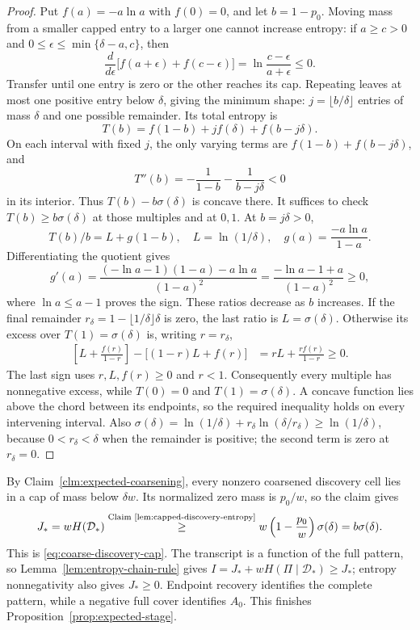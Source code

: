 \begin{proof}
Put $f(a)=-a\ln a$ with $f(0)=0$, and let $b=1-p_0$.
Moving mass from a smaller capped entry to a larger one cannot
increase entropy: if $a\ge c>0$ and
$0\le\epsilon\le\min\{\delta-a,c\}$, then
\[
 \frac{d}{d\epsilon}
 \bigl[f(a+\epsilon)+f(c-\epsilon)\bigr]
 =\ln\frac{c-\epsilon}{a+\epsilon}\le0.
\]
Transfer until one entry is zero or the other reaches its cap.
Repeating leaves at most one positive entry below $\delta$, giving
the minimum
shape: $j=\lfloor b/\delta\rfloor$ entries of mass $\delta$ and
one possible remainder. Its total entropy is
\[
 T(b)=f(1-b)+j f(\delta)+f(b-j\delta).
\]
On each interval with fixed $j$, the only varying terms are
$f(1-b)+f(b-j\delta)$, and
\[
 T''(b)=-\frac1{1-b}-\frac1{b-j\delta}<0
\]
in its interior. Thus $T(b)-b\sigma(\delta)$ is concave there.
It suffices to check $T(b)\ge b\sigma(\delta)$ at those
multiples and at $0,1$. At $b=j\delta>0$,
\[
 T(b)/b=L+g(1-b),\quad L=\ln(1/\delta),\quad
 g(a)=\frac{-a\ln a}{1-a}.
\]
Differentiating the quotient gives
\[
 g'(a)=\frac{(-\ln a-1)(1-a)-a\ln a}{(1-a)^2}
      =\frac{-\ln a-1+a}{(1-a)^2}\ge0,
\]
where $\ln a\le a-1$ proves the sign. These ratios decrease
as $b$ increases. If the final remainder $r_\delta=1-\lfloor1/\delta\rfloor\delta$
is zero, the last ratio is $L=\sigma(\delta)$. Otherwise its
excess over $T(1)=\sigma(\delta)$ is, writing $r=r_\delta$,
\[
 \begin{aligned}
 \left[L+\frac{f(r)}{1-r}\right]
     -\bigl[(1-r)L+f(r)\bigr]
 &=rL+\frac{r f(r)}{1-r}\ge0.
 \end{aligned}
\]
The last sign uses $r,L,f(r)\ge0$ and $r<1$. Consequently
every multiple has nonnegative excess, while
$T(0)=0$ and $T(1)=\sigma(\delta)$. A concave function lies above
the chord between its endpoints, so the required inequality holds
on every intervening interval. Also
$\sigma(\delta)=\ln(1/\delta)+r_\delta\ln(\delta/r_\delta)
\ge\ln(1/\delta)$,
because $0<r_\delta<\delta$ when the remainder is positive;
the second term is zero at $r_\delta=0$.
\end{proof}
By Claim~\ref{clm:expected-coarsening}, every nonzero coarsened
discovery cell lies in a cap of mass below
$\delta w$. Its normalized zero mass is $p_0/w$, so the claim gives
\[
 J_*=wH(\mathcal D_*)\byref{Claim}{lem:capped-discovery-entropy}{\ge}
      w\left(1-\frac{p_0}{w}\right)\sigma(\delta)
      =b\sigma(\delta).
\]
This is \eqref{eq:coarse-discovery-cap}. The transcript is a function
of the full pattern, so Lemma~\ref{lem:entropy-chain-rule} gives
$I=J_*+wH(\Pi\mid\mathcal D_*)\ge J_*$; entropy nonnegativity
also gives $J_*\ge0$. Endpoint recovery identifies
the complete pattern, while a negative full cover identifies $A_0$.
This finishes Proposition~\ref{prop:expected-stage}.

